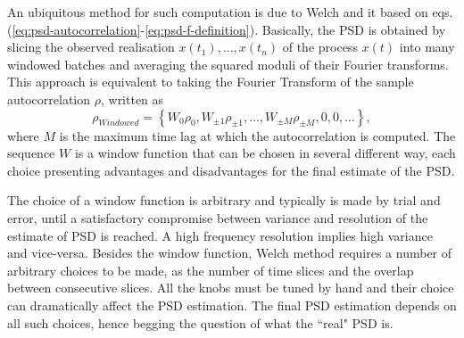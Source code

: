 \documentclass[twocolumn,showpacs,preprintnumbers,nofootinbib,prd,
superscriptaddress,10pt]{revtex4-1}
\begin{document}

An ubiquitous method for such computation is due to Welch \cite{Welch1967} and it based on eqs.(\ref{eq:psd-autocorrelation}-\ref{eq:psd-f-definition}).
Basically, the PSD is obtained by slicing the observed realisation $x(t_1),\ldots,x(t_n)$ of the process $x(t)$ into many windowed batches and averaging the squared moduli of their Fourier transforms.
This approach is equivalent \cite{Lomb,Scargle} to taking the Fourier Transform of the sample autocorrelation $\rho$, written as
\begin{equation}
    \rho_{Windowed} = \left\{W_0\rho_0,W_{\pm 1}\rho_{\pm 1}, \dots, W_{\pm M}\rho_{\pm M}, 0, 0, \dots \right\},
\end{equation}
where $M$ is the maximum time lag at which the autocorrelation is computed.
The sequence $W$ is a window function that can be chosen in several different way, each choice presenting advantages and disadvantages for the final estimate of the PSD.

The choice of a window function is arbitrary and typically is made by trial and error, until a satisfactory compromise between variance and resolution of the estimate of PSD is reached. A high frequency resolution implies high variance and vice-versa.
Besides the window function, Welch method requires a number of arbitrary choices to be made, as the number of time slices and the overlap between consecutive slices. All the knobs must be tuned by hand and their choice can dramatically affect the PSD estimation.
The final PSD estimation depends on all such choices, hence begging the question of what the ``real" PSD is.
\end{document}
